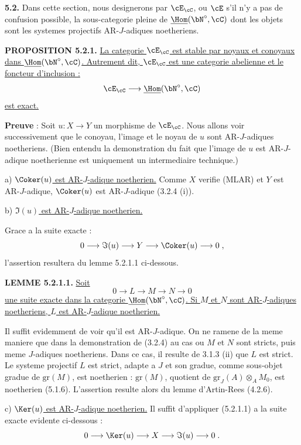 \medskip
\noindent\textbf{5.2.} Dans cette section, nous designerons par $\cE_\cC$, ou $\cE$ s'il n'y a pas de confusion possible, la sous-categorie pleine de $\underline{\Hom}(\bN^\circ, \cC)$ dont les objets sont les systemes projectifs AR-$J$-adiques noetheriens.

\medskip
\noindent\textbf{PROPOSITION 5.2.1.} \underline{La categorie $\cE_\cC$ est stable par noyaux et conoyaux dans $\underline{\Hom}(\bN^\circ, \cC)$. Autrement dit, $\cE_\cC$ est une categorie abelienne et le foncteur d'inclusion :}
\[
\cE_\cC \longrightarrow \underline{\Hom}(\bN^\circ, \cC)
\]
\underline{est exact.}

\textbf{Preuve} : Soit $u : X \longrightarrow Y$ un morphisme de $\cE_\cC$. Nous allons voir successivement que le conoyau, l'image et le noyau de $u$ sont AR-$J$-adiques noetheriens. (Bien entendu la demonstration du fait que l'image de $u$ est AR-$J$-adique noetherienne est uniquement un intermediaire technique.)

a) \underline{$\Coker(u)$ est AR-$J$-adique noetherien.} Comme $X$ verifie (MLAR) et $Y$ est AR-$J$-adique, $\Coker(u)$ est AR-$J$-adique (3.2.4 (i)).

b) \underline{$\Im(u)$ est AR-$J$-adique noetherien.}

Grace a la suite exacte :
\[
0 \longrightarrow \Im(u) \longrightarrow Y \longrightarrow \Coker(u) \longrightarrow 0\;,
\]
l'assertion resultera du lemme 5.2.1.1 ci-dessous.

\medskip
\noindent\textbf{LEMME 5.2.1.1.} \underline{Soit}
\[
0 \longrightarrow L \longrightarrow M \longrightarrow N \longrightarrow 0
\]
\underline{une suite exacte dans la categorie $\underline{\Hom}(\bN^\circ, \cC)$. Si $M$ et $N$ sont AR-$J$-adiques noetheriens, $L$ est AR-$J$-adique noetherien.}

Il suffit evidemment de voir qu'il est AR-$J$-adique. On ne ramene de la meme maniere que dans la demonstration de (3.2.4) au cas ou $M$ et $N$ sont stricts, puis meme $J$-adiques noetheriens. Dans ce cas, il resulte de 3.1.3 (ii) que $L$ est strict. Le systeme projectif $L$ est strict, adapte a $J$ et son gradue, comme sous-objet gradue de $\mathrm{gr}(M)$, est noetherien : $\mathrm{gr}(M)$, quotient de $\mathrm{gr}_J(A) \otimes_A M_0$, est noetherien (5.1.6). L'assertion resulte alors du lemme d'Artin-Rees (4.2.6).

c) \underline{$\Ker(u)$ est AR-$J$-adique noetherien.} Il suffit d'appliquer (5.2.1.1) a la suite exacte evidente ci-dessous :
\[
0 \longrightarrow \Ker(u) \longrightarrow X \longrightarrow \Im(u) \longrightarrow 0\;.
\]

